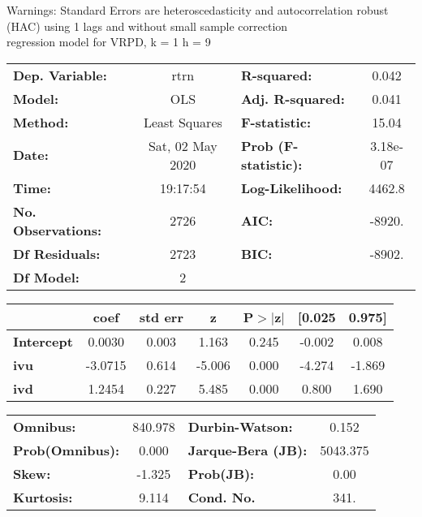 Warnings: \newline
 [1] Standard Errors are heteroscedasticity and autocorrelation robust (HAC) using 1 lags and without small sample correction\\ 

regression model for VRPD, k = 1 h = 9\begin{center}
\begin{tabular}{lclc}
\toprule
\textbf{Dep. Variable:}    &       rtrn       & \textbf{  R-squared:         } &     0.042   \\
\textbf{Model:}            &       OLS        & \textbf{  Adj. R-squared:    } &     0.041   \\
\textbf{Method:}           &  Least Squares   & \textbf{  F-statistic:       } &     15.04   \\
\textbf{Date:}             & Sat, 02 May 2020 & \textbf{  Prob (F-statistic):} &  3.18e-07   \\
\textbf{Time:}             &     19:17:54     & \textbf{  Log-Likelihood:    } &    4462.8   \\
\textbf{No. Observations:} &        2726      & \textbf{  AIC:               } &    -8920.   \\
\textbf{Df Residuals:}     &        2723      & \textbf{  BIC:               } &    -8902.   \\
\textbf{Df Model:}         &           2      & \textbf{                     } &             \\
\bottomrule
\end{tabular}
\begin{tabular}{lcccccc}
                   & \textbf{coef} & \textbf{std err} & \textbf{z} & \textbf{P$> |$z$|$} & \textbf{[0.025} & \textbf{0.975]}  \\
\midrule
\textbf{Intercept} &       0.0030  &        0.003     &     1.163  &         0.245        &       -0.002    &        0.008     \\
\textbf{ivu}       &      -3.0715  &        0.614     &    -5.006  &         0.000        &       -4.274    &       -1.869     \\
\textbf{ivd}       &       1.2454  &        0.227     &     5.485  &         0.000        &        0.800    &        1.690     \\
\bottomrule
\end{tabular}
\begin{tabular}{lclc}
\textbf{Omnibus:}       & 840.978 & \textbf{  Durbin-Watson:     } &    0.152  \\
\textbf{Prob(Omnibus):} &   0.000 & \textbf{  Jarque-Bera (JB):  } & 5043.375  \\
\textbf{Skew:}          &  -1.325 & \textbf{  Prob(JB):          } &     0.00  \\
\textbf{Kurtosis:}      &   9.114 & \textbf{  Cond. No.          } &     341.  \\
\bottomrule
\end{tabular}
\end{center}

